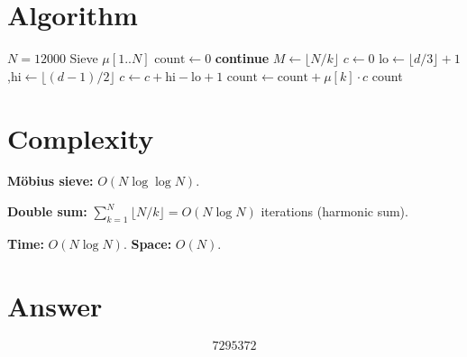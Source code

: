\documentclass[12pt,a4paper]{article}
\begin{document}
\section{Algorithm}

\begin{algorithm}[H]
\caption{Count fractions in $(1/3, 1/2)$ via M\"obius summation}
\begin{algorithmic}[1]
\Require $N = 12000$
\State Sieve $\mu[1..N]$
\State $\text{count} \gets 0$
     \textbf{continue} \EndIf
    \State $M \gets \lfloor N/k \rfloor$
    \State $c \gets 0$
        \State $\text{lo} \gets \lfloor d/3 \rfloor + 1$,\quad $\text{hi} \gets \lfloor (d-1)/2 \rfloor$
            \State $c \gets c + \text{hi} - \text{lo} + 1$
        \EndIf
    \EndFor
    \State $\text{count} \gets \text{count} + \mu[k] \cdot c$
\EndFor
\State \Return count
\end{algorithmic}
\end{algorithm}

\section{Complexity}

\textbf{M\"obius sieve:} $O(N \log \log N)$.

\textbf{Double sum:} $\sum_{k=1}^{N} \lfloor N/k \rfloor = O(N \log N)$ iterations (harmonic sum).

\textbf{Time:} $O(N \log N)$. \quad \textbf{Space:} $O(N)$.

\section{Answer}

\[
\boxed{7295372}
\]
\end{document}
